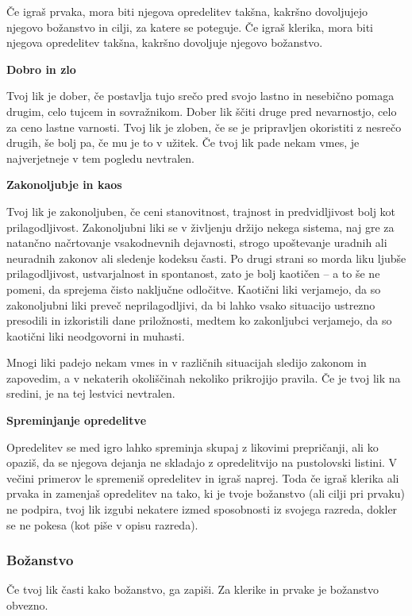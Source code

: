Če igraš prvaka, mora biti njegova opredelitev takšna, kakršno dovoljujejo njegovo božanstvo in cilji, za katere se poteguje. Če igraš klerika, mora biti njegova opredelitev takšna, kakršno dovoljuje njegovo božanstvo.

\textbf{Dobro in zlo}

Tvoj lik je dober, če postavlja tujo srečo pred svojo lastno in nesebično pomaga drugim, celo tujcem in sovražnikom. Dober lik ščiti druge pred nevarnostjo, celo za ceno lastne varnosti. Tvoj lik je zloben, če se je pripravljen okoristiti z nesrečo drugih, še bolj pa, če mu je to v užitek. Če tvoj lik pade nekam vmes, je najverjetneje v tem pogledu nevtralen.

\textbf{Zakonoljubje in kaos}

Tvoj lik je zakonoljuben, če ceni stanovitnost, trajnost in predvidljivost bolj kot prilagodljivost. Zakonoljubni liki se v življenju držijo nekega sistema, naj gre za natančno načrtovanje vsakodnevnih dejavnosti, strogo upoštevanje uradnih ali neuradnih zakonov ali sledenje kodeksu časti. Po drugi strani so morda liku ljubše prilagodljivost, ustvarjalnost in spontanost, zato je bolj kaotičen -- a to še ne pomeni, da sprejema čisto naključne odločitve. Kaotični liki verjamejo, da so zakonoljubni liki preveč neprilagodljivi, da bi lahko vsako situacijo ustrezno presodili in izkoristili dane priložnosti, medtem ko zakonljubci verjamejo, da so kaotični liki neodgovorni in muhasti.

Mnogi liki padejo nekam vmes in v različnih situacijah sledijo zakonom in zapovedim, a v nekaterih okoliščinah nekoliko prikrojijo pravila. Če je tvoj lik na sredini, je na tej lestvici nevtralen.

\textbf{Spreminjanje opredelitve}

Opredelitev se med igro lahko spreminja skupaj z likovimi prepričanji, ali ko opaziš, da se njegova dejanja ne skladajo z opredelitvijo na pustolovski listini. V večini primerov le spremeniš opredelitev in igraš naprej. Toda če igraš klerika ali prvaka in zamenjaš opredelitev na tako, ki je tvoje božanstvo (ali cilji pri prvaku) ne podpira, tvoj lik izgubi nekatere izmed sposobnosti iz svojega razreda, dokler se ne pokesa (kot piše v opisu razreda).

\subsubsection{Božanstvo}
Če tvoj lik časti kako božanstvo, ga zapiši. Za klerike in prvake je božanstvo obvezno.

